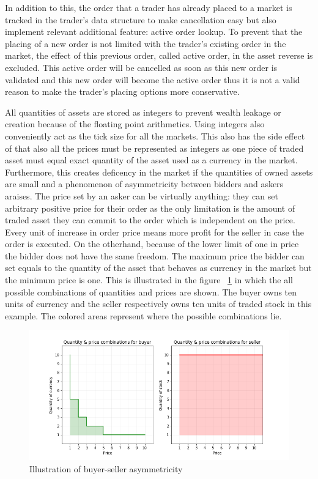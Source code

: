 In addition to this, the order that a trader has already placed
to a market is tracked in the trader's data structure to make cancellation easy
but also implement relevant additional feature: active order lookup. To prevent that
the placing of a new order is not limited with the trader's existing order in the market,
the effect of this previous order, called active order, in the asset reverse is excluded. 
This active order will be cancelled as soon as this new order is validated and this new order
will become the active order thus it is not a valid reason to make the trader's placing 
options more conservative.

All quantities of assets are stored as integers to prevent wealth leakage
or creation because of the floating point arithmetics. Using integers also
conveniently act as the tick size for all the markets. This also has the side effect
of that also all the prices must be represented as integers as one piece
of traded asset must equal exact quantity of the asset used as a currency
in the market. Furthermore, this creates deficency in the market if the quantities
of owned assets are small and a phenomenon of asymmetricity between bidders and askers
araises. The price set by an asker can be virtually anything: they can set
arbitrary positive price for their order as the only limitation is the amount
of traded asset they can commit to the order which is independent on the price. 
Every unit of increase in order price means more profit for the seller
in case the order is executed. On the otherhand, because of the 
lower limit of one in price the bidder does not have the same freedom.
The maximum price the bidder can set equals to the quantity of the asset
that behaves as currency in the market but the minimum price is one. This is
illustrated in the figure ~\ref{fig:buy_sell_asym} in which the all possible
combinations of quantities and prices are shown. The buyer owns
ten units of currency and the seller respectively owns ten units of traded stock in
this example. The colored areas represent where the possible combinations
lie.

 \begin{figure}
    \includegraphics[width=\linewidth]{plots/buyer_seller_asymmetricity.png}
    \caption{Illustration of buyer-seller asymmetricity}
    \label{fig:buy_sell_asym}
\end{figure}

